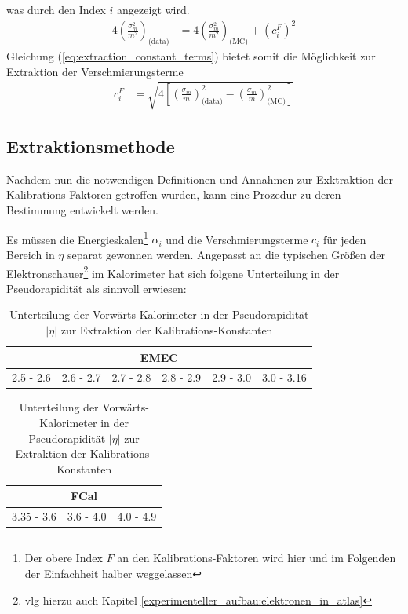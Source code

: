 was durch den Index $i$ angezeigt wird.
\begin{align}
    \label{eq:extraction_constant_terms}
    4\left(\frac{\sigma_m^2}{m^2}\right)_\text{(data)}
        &= 4\left(\frac{\sigma_m^2}{m^2}\right)_\text{(MC)}
        + \left(c_i^F\right)^2
\end{align}
Gleichung (\ref{eq:extraction_constant_terms}) bietet somit die Möglichkeit zur
Extraktion der Verschmierungsterme
\begin{align}
    c_i^F &= \sqrt{ 4 \left[ \left(\frac{\sigma_m}{m}\right)^2_\text{(data)}
             - \left(\frac{\sigma_m}{m}\right)^2_\text{(MC)} \right] }
    \label{eq:constant_terms}
\end{align}



\subsection{Extraktionsmethode}
\label{energy_calibration:beschreibung_der_methode:extraktionsmethode}
Nachdem nun die notwendigen Definitionen und Annahmen zur Exktraktion der
Kali\-brations-Faktoren getroffen wurden, kann eine Prozedur zu deren
Bestimmung entwickelt werden.

Es müssen die Energieskalen\footnote{Der obere Index $F$ an den
Kalibrations-Faktoren wird hier und im Folgenden der Einfachheit halber
weggelassen} $\alpha_i$ und die Verschmierungsterme $c_i$ für jeden Bereich in
$\eta$ separat gewonnen werden. Angepasst an die typischen Größen der
Elektronschauer\footnote{vlg hierzu auch Kapitel
\ref{experimenteller_aufbau:elektronen_in_atlas}} im Kalorimeter hat sich
folgene Unterteilung in der Pseudorapidität als sinnvoll erwiesen:

\begin{table}[h]
    \centering
    \begin{tabular}{|c|c|c|c|c|c|}
        \multicolumn{6}{c}{\textbf{EMEC}} \\
        \hline
        2.5 - 2.6 & 2.6 - 2.7 & 2.7 - 2.8 & 2.8 - 2.9 & 2.9 - 3.0 & 3.0 - 3.16
        \\ \hline
    \end{tabular}
    \vspace{10pt}

    \begin{tabular}{|c|c|c|}
        \multicolumn{3}{c}{\textbf{FCal}} \\
        \hline
        3.35 - 3.6 & 3.6 - 4.0 & 4.0 - 4.9 \\
        \hline
    \end{tabular}
    \caption{Unterteilung der Vorwärts-Kalorimeter in der Pseudorapidität
             $|\eta|$ zur Extraktion der Kalibrations-Konstanten}
    \label{tab:calibration_binning}
\end{table}

